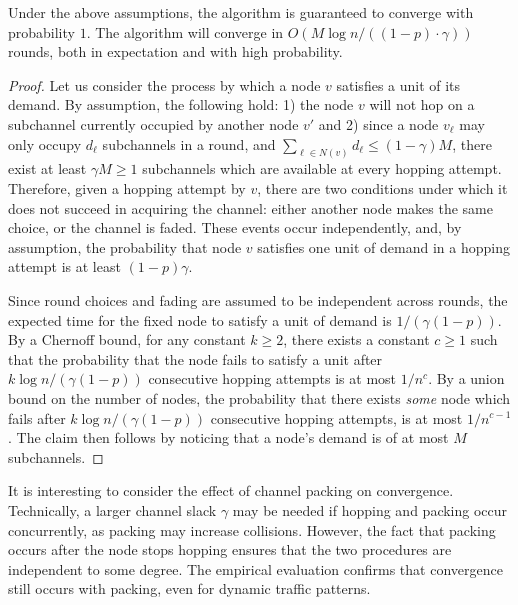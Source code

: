 \begin{thm}
\label{thm:convergence}
	Under the above assumptions, the algorithm is guaranteed to converge with probability $1$. The algorithm will converge in $O( M \log n / ((1 - p) \cdot \gamma) )$ rounds, both in expectation and with high probability.   
\end{thm}
\begin{proof}
	Let us consider the process by which a node $v$ satisfies a unit of its demand. By assumption, the following hold: 1) the node $v$ will not hop on a subchannel currently occupied by another node $v'$ and 2) since a node $v_\ell$ may only occupy $d_\ell$ subchannels in a round, and $\sum_{\ell \in N(v)} d_\ell \leq (1 - \gamma) M$, there exist at least $\gamma M \geq 1$ subchannels which are available at every hopping attempt. Therefore, given a hopping attempt by $v$, there are two conditions under which it does not succeed in acquiring the channel: either another node makes the same choice, or the channel is faded. These events occur independently, and, by assumption, the probability that node $v$ satisfies one unit of demand in a hopping attempt is at least $(1 - p) \gamma$.  
	
	Since round choices and fading are assumed to be independent across rounds, the expected time for the fixed node to satisfy a unit of demand is $ 1 / (\gamma (1 - p))$. By a Chernoff bound, for any constant $k \geq 2$, there exists a constant $c \geq 1$ such that the probability that the node fails to satisfy a unit after $k \log n / (\gamma (1 - p) )$ consecutive hopping attempts is at most $1 / n^c$. 
	By a union bound on the number of nodes, the probability that there exists \emph{some} node which fails after $k \log n / (\gamma (1 - p ))$ consecutive hopping attempts, is at most $1 / n^{c - 1}$. 
	The claim then follows by noticing that a node's demand is of at most $M$ subchannels. 
\end{proof}


It is interesting to consider the effect of channel packing on convergence. 
Technically, a larger channel slack $\gamma$ may be needed if hopping and packing occur concurrently, as packing may increase collisions. 
However, the fact that packing occurs after the node stops hopping ensures that the two procedures are independent to some degree.
The empirical evaluation confirms that convergence still occurs with packing, even for dynamic traffic patterns. 

